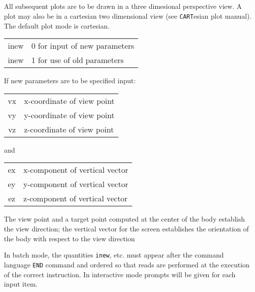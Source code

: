  \\{\smallskip}
 \\{\smallskip}
 \\{\smallskip}
 \\{\smallskip}
\headb

All subsequent plots are to be drawn in a three dimesional perspective view.
A plot may also be in a cartesian two dimensional view
(see {\tt CART}esian plot manual).  The default plot mode is cartesian.

\begin{center}
\begin{tabular}{c | l }
 inew & 0 for input of new parameters \\
 inew & 1 for use of old parameters
\end{tabular}
\end{center}

If new parameters are to be specified input:

\begin{center}
\begin{tabular}{c | l }
 vx & x-coordinate of view point \\
 vy & y-coordinate of view point \\
 vz & z-coordinate of view point
\end{tabular}
\end{center}
and
\begin{center}
\begin{tabular}{c | l }
 ex & x-component of vertical vector \\
 ey & y-component of vertical vector \\
 ez & z-component of vertical vector
\end{tabular}
\end{center}

The view point and a target point computed at the center of
the body establish the view direction; the vertical vector
for the screen establishes the orientation of the body with
respect to the view direction

In batch mode, the quantities {\tt inew}, etc. must appear
after the command language {\tt END} command and ordered so that reads are
performed at the execution of the correct instruction.
In interactive mode prompts will be given for each input item.
\vfill
\eject
